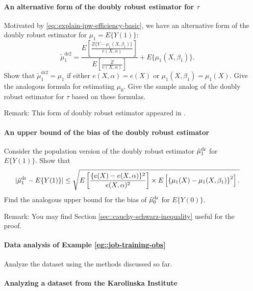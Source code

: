 \paragraph{An alternative form of the doubly robust estimator for $\tau$}\label{hw::alternative-dr2-robins}

Motivated by \eqref{eq::explain-ipw-efficiency-basic}, we have an alternative form of the doubly robust estimator for $\mu_1 = E\{ Y(1) \} $: 
$$
\tilde{\mu}_1^\text{dr2} = 
\frac{ E\left[   \frac{Z\{ Y-\mu_1(X,\beta_1) \}}{  e(X,\alpha) } \right] }{E\left[   \frac{Z }{  e(X,\alpha) } \right]} 
 + E\{ \mu_1(X, \beta_1)  \} .
$$
Show that $\tilde{\mu}_1^\text{dr2} = \mu_1$ if either $e(X,\alpha)  = e(X)$ or $\mu_1(X, \beta_1) =  \mu_1(X)$. Give the analogous formula for estimating $\mu_0$. Give the sample analog of the doubly robust estimator for $\tau$ based on these formulas. 

Remark: 
This form of doubly robust estimator appeared in \citet{robins2007comment}. 



\paragraph{An upper bound of the bias of the doubly robust estimator}\label{hw::upperbound-dr}


Consider the population version of the doubly robust estimator $\tilde{\mu}_1^\textup{dr} $ for $E\{  Y(1) \} $. 
Show that
$$
 |   \tilde{\mu}_1^\textup{dr} - E\{  Y(1) \}  |  \leq
\sqrt{
E\left[   \frac{ \{  e(X) - e(X,\alpha)\}^2  }{  e(X,\alpha)^2 }  \right] \times 
E\left[  \left\{  \mu_1(X) -  \mu_1(X, \beta_1)   \right\}^2 \right] .
}
$$
Find the analogous upper bound for the bias of $\tilde{\mu}_0^\textup{dr} $ for $E\{  Y(0) \} $. 


Remark: You may find Section \ref{sec::cauchy-schwarz-inequality} useful for the proof. 


\paragraph{Data analysis of Example \ref{eg::job-training-obs}}


Analyze the dataset  using the methods discussed so far. 

 
 
\paragraph{Analyzing a dataset from the Karolinska Institute}\label{hw::Karolinska-dr}
 
